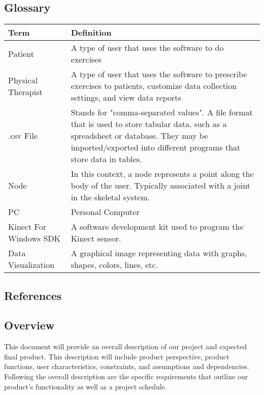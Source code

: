 \documentclass[onecolumn, draftclsnofoot,10pt, compsoc]{IEEEtran}
\begin{document}
\subsection{Glossary}
        \begin{tabu} to 
        \hline
        \textbf{Term} & \textbf{Definition}\\
        \hline
        Patient & A type of user that uses the software to do exercises\\
        \hline
        Physical Therapist & A type of user that uses the software to prescribe exercises to patients, customize data collection settings, and view data reports\\
        \hline
        .csv File & Stands for "comma-separated values". A file format that is used to store tabular data, such as a spreadsheet or database. They may be imported/exported into different programs that store data in tables\cite{csvFile}.\\
        \hline
        Node & In this context, a node represents a point along the body of the user. Typically associated with a joint in the skeletal system\cite{KinectDevelop}.\\
        \hline
        PC & Personal Computer\\
        \hline
        Kinect For Windows SDK & A software development kit used to program the Kinect sensor\cite{KinectDevelop}.\\
        \hline
        Data Visualization & A graphical image representing data with graphs, shapes, colors, lines, etc.\\
        \hline
\end{tabu}
\subsection{References}



\newpage
\subsection{Overview}
This document will provide an overall description of our project and expected final 
product. This description will include product perspective, product functions, user 
characteristics, constraints, and assumptions and dependencies. Following the overall 
description are the specific requirements that outline our product's functionality as 
well as a project schedule.
\end{document}
